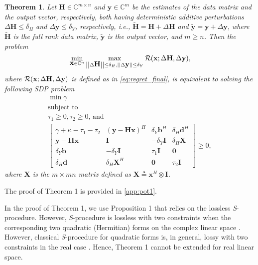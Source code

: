 \documentclass[review,sort&compress]{elsarticle}
\newtheorem{thm}{Theorem}
\renewcommand{\vec}[1]{\mbox{$\mathbf{#1}$}}
\newcommand{\norm}[1]{\left|\left|#1\right|\right|}
\newcommand{\defi}{\triangleq}
\newcommand{\nn}{\nonumber}
\newcommand{\C}{\mathbb{C}}
\newcommand{\R}{{\cal R}}
\newcommand{\vH}{\vec{H}}
\newcommand{\vx}{\vec{x}}
\newcommand{\vy}{\vec{y}}
\newcommand{\dH}{\Delta\vH}
\newcommand{\dy}{\Delta\vy}
\newcommand{\tH}{\tilde{\vec{H}}}
\newcommand{\ty}{\tilde{\vec{y}}}
\newcommand{\vd}{\vec{d}}
\newcommand{\vX}{\vec{X}}
\newcommand{\vI}{\vec{I}}
\newcommand{\vb}{\vec{b}}
\begin{document}
\begin{thm}\label{thm1}
Let $\vH \in \C^{m\times n}$ and $\vy \in \C^{m}$ be the estimates of the data matrix and the output vector, respectively, both having deterministic additive perturbations $\dH \leq \delta_H$ and $\dy \leq \delta_Y$, respectively, i.e., $\tH=\vH+\dH$ and $\ty=\vy+\dy$, where $\tH$ is the full rank data matrix, $\ty$ is the output vector, and $m \geq n$. Then the problem
\begin{equation}\label{eq:prudefthm1}
  \min_{\vx \in \C^n} \max_{\norm{\dH} \leq \delta_H,\norm{\dy} \leq \delta_Y} \R(\vx; \dH,\dy),
\end{equation}
where $\R(\vx; \dH,\dy)$ is defined as in \eqref{eq:regret_final}, is equivalent to solving the following SDP problem
\begin{gather}
  \min \gamma \nn\\
  \mbox{subject to} \nn\\
  \tau_1 \geq 0, \tau_2 \geq 0 \text{, and} \nn\\
  \begin{bmatrix}
  \gamma + \kappa - \tau_1 - \tau_2 & (\vy-\vH\vx)^H & \delta_Y \vb^H  & \delta_H\vd^H \\
  \vy-\vH\vx                        & \vI            & -\delta_Y\vI    & \delta_H\vX \\
  \delta_Y \vb                      & -\delta_Y\vI   & \tau_1 \vI      & \vec{0} \\
  \delta_H\vd                       & \delta_H\vX^H  & \vec{0}         & \tau_2 \vI
  \end{bmatrix} \geq 0,
\end{gather}
where $\vX$ is the $m\times mn$ matrix defined as $\vX \defi \vx^H \otimes \vI$.
\end{thm}

The proof of Theorem 1 is provided in \ref{app:pot1}.

\begin{rmk}
In the proof of Theorem 1, we use Proposition 1 that relies on the lossless {\em S}-procedure. However, {\em S}-procedure is lossless with two constraints when the corresponding two quadratic (Hermitian) forms on the complex linear space \cite{s1}. However, classical {\em S}-procedure for quadratic forms is, in general, lossy with two constraints in the real case \cite{s2}. Hence, Theorem 1 cannot be extended for real linear space.
\end{rmk}
\end{document}
